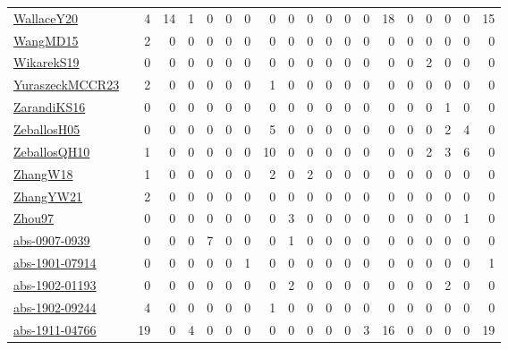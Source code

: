 {\begin{longtable}{l*{18}{r}}
\href{articles/WallaceY20.pdf}{WallaceY20}~\cite{WallaceY20} & 4 & 14 & 1 & 0 & 0 & 0 & 0 & 0 & 0 & 0 & 0 & 0 & 18 & 0 & 0 & 0 & 0 & 15\\
\href{articles/WangMD15.pdf}{WangMD15}~\cite{WangMD15} & 2 & 0 & 0 & 0 & 0 & 0 & 0 & 0 & 0 & 0 & 0 & 0 & 0 & 0 & 0 & 0 & 0 & 0\\
\href{articles/WikarekS19.pdf}{WikarekS19}~\cite{WikarekS19} & 0 & 0 & 0 & 0 & 0 & 0 & 0 & 0 & 0 & 0 & 0 & 0 & 0 & 0 & 2 & 0 & 0 & 0\\
\href{articles/YuraszeckMCCR23.pdf}{YuraszeckMCCR23}~\cite{YuraszeckMCCR23} & 2 & 0 & 0 & 0 & 0 & 0 & 1 & 0 & 0 & 0 & 0 & 0 & 0 & 0 & 0 & 0 & 0 & 0\\
\href{articles/ZarandiKS16.pdf}{ZarandiKS16}~\cite{ZarandiKS16} & 0 & 0 & 0 & 0 & 0 & 0 & 0 & 0 & 0 & 0 & 0 & 0 & 0 & 0 & 0 & 1 & 0 & 0\\
\href{articles/ZeballosH05.pdf}{ZeballosH05}~\cite{ZeballosH05} & 0 & 0 & 0 & 0 & 0 & 0 & 5 & 0 & 0 & 0 & 0 & 0 & 0 & 0 & 0 & 2 & 4 & 0\\
\href{articles/ZeballosQH10.pdf}{ZeballosQH10}~\cite{ZeballosQH10} & 1 & 0 & 0 & 0 & 0 & 0 & 10 & 0 & 0 & 0 & 0 & 0 & 0 & 0 & 2 & 3 & 6 & 0\\
\href{articles/ZhangW18.pdf}{ZhangW18}~\cite{ZhangW18} & 1 & 0 & 0 & 0 & 0 & 0 & 2 & 0 & 2 & 0 & 0 & 0 & 0 & 0 & 0 & 0 & 0 & 0\\
\href{articles/ZhangYW21.pdf}{ZhangYW21}~\cite{ZhangYW21} & 2 & 0 & 0 & 0 & 0 & 0 & 0 & 0 & 0 & 0 & 0 & 0 & 0 & 0 & 0 & 0 & 0 & 0\\
\href{articles/Zhou97.pdf}{Zhou97}~\cite{Zhou97} & 0 & 0 & 0 & 0 & 0 & 0 & 0 & 3 & 0 & 0 & 0 & 0 & 0 & 0 & 0 & 0 & 1 & 0\\
\href{articles/abs-0907-0939.pdf}{abs-0907-0939}~\cite{abs-0907-0939} & 0 & 0 & 0 & 7 & 0 & 0 & 0 & 1 & 0 & 0 & 0 & 0 & 0 & 0 & 0 & 0 & 0 & 0\\
\href{articles/abs-1901-07914.pdf}{abs-1901-07914}~\cite{abs-1901-07914} & 0 & 0 & 0 & 0 & 0 & 1 & 0 & 0 & 0 & 0 & 0 & 0 & 0 & 0 & 0 & 0 & 0 & 1\\
\href{articles/abs-1902-01193.pdf}{abs-1902-01193}~\cite{abs-1902-01193} & 0 & 0 & 0 & 0 & 0 & 0 & 0 & 2 & 0 & 0 & 0 & 0 & 0 & 0 & 0 & 2 & 0 & 0\\
\href{articles/abs-1902-09244.pdf}{abs-1902-09244}~\cite{abs-1902-09244} & 4 & 0 & 0 & 0 & 0 & 0 & 1 & 0 & 0 & 0 & 0 & 0 & 0 & 0 & 0 & 0 & 0 & 0\\
\href{articles/abs-1911-04766.pdf}{abs-1911-04766}~\cite{abs-1911-04766} & 19 & 0 & 4 & 0 & 0 & 0 & 0 & 0 & 0 & 0 & 0 & 3 & 16 & 0 & 0 & 0 & 0 & 19\\

\end{longtable}}
